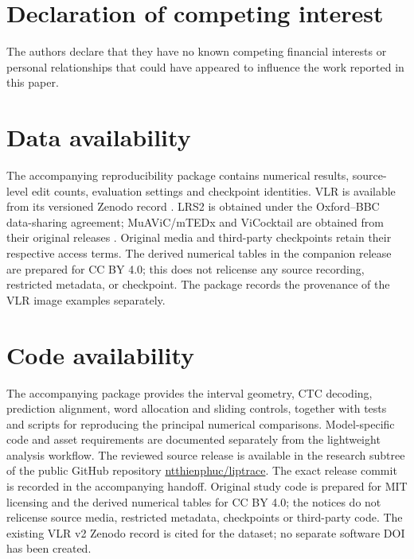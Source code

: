 \documentclass[authoryear,preprint,review,12pt]{elsarticle}
\begin{document}







\begingroup
\small


\endgroup

\clearpage
\appendix


\section*{Declaration of competing interest}
The authors declare that they have no known competing financial interests or personal relationships
that could have appeared to influence the work reported in this paper.

\section*{Data availability}
The accompanying reproducibility package contains numerical results, source-level
edit counts, evaluation settings and checkpoint identities. VLR is available from
its versioned Zenodo record \citep{vlr2026dataset}. LRS2 is obtained under the
Oxford--BBC data-sharing agreement; MuAViC/mTEDx and ViCocktail are obtained from
their original releases \citep{afouras2022deep,anwar2023muavic,nguyen2025vicocktail}.
Original media and third-party checkpoints retain their respective access terms.
The derived numerical tables in the companion release are prepared for CC BY 4.0;
this does not relicense any source recording, restricted metadata, or checkpoint.
The package records the provenance of the VLR image examples separately.

\section*{Code availability}
The accompanying package provides the interval geometry, CTC decoding,
prediction alignment, word allocation and sliding controls, together with tests
and scripts for reproducing the principal numerical comparisons. Model-specific
code and asset requirements are documented separately from the lightweight
analysis workflow. The reviewed source release is available in the research subtree
of the public GitHub repository
\href{https://github.com/ntthienphuc/liptrace/tree/main/research/context_aware_interval_2026-10-24}{ntthienphuc/liptrace}. The exact release commit is recorded in the accompanying handoff. Original study code is prepared for MIT licensing and the
derived numerical tables for CC BY 4.0; the notices do not relicense source media,
restricted metadata, checkpoints or third-party code. The existing VLR v2 Zenodo
record is cited for the dataset; no separate software DOI has been created.
\end{document}
